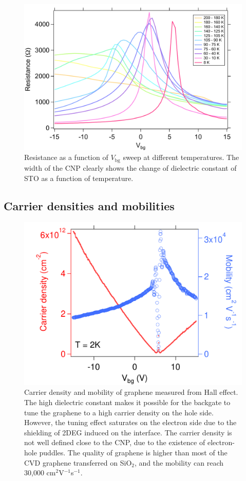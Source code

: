 \documentclass[pdflatex, sectionletters, 12pt]{pittetd}    %
\begin{document}
\begin{figure}[h!]
	\centering
	\includegraphics[width=.8\textwidth]{Drawing/ResistanceTemp.pdf}
	\caption{Resistance as a function of $V_\mathrm{bg}$ sweep at different temperatures. The width of the CNP clearly shows the change of dielectric constant of STO as a function of temperature.}
	\label{FIG:ResistanceTemp}
\end{figure}

\subsection{Carrier densities and mobilities}

\begin{figure}[h!]
	\centering
	\includegraphics[width=.55\textwidth]{Drawing/CarrierDensityMobility.pdf}
	\caption{Carrier density and mobility of graphene measured from Hall effect. The high dielectric constant makes it possible for the backgate to tune the graphene to a high carrier density on the hole side. However, the tuning effect saturates on the electron side due to the shielding of 2DEG induced on the interface. The carrier density is not well defined close to the CNP, due to the existence of electron-hole puddles. The quality of graphene is higher than most of the CVD graphene transferred on SiO$_2$, and the mobility can reach 30,000 cm$^2$V$^{-1}$s$^{-1}$.}
	\label{FIG:CarrierDensityMobility}
\end{figure}
\end{document}

